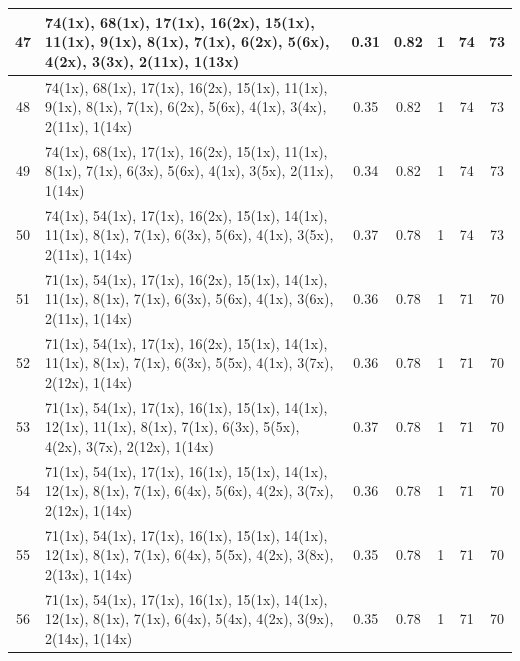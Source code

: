 \begin{small}
\begin{longtable}{|c|p{4cm}|c|c|c|c|c|}
  47 & 74(1x), 68(1x), 17(1x), 16(2x), 15(1x), 11(1x), 9(1x), 8(1x), 7(1x), 6(2x), 5(6x), 4(2x), 3(3x), 2(11x), 1(13x) & \cellcolor{colorGood}  0.31 & \cellcolor{colorGood} 0.82 & 1 & 74 & \cellcolor{colorBad} 73 \\   \hline
  48 & 74(1x), 68(1x), 17(1x), 16(2x), 15(1x), 11(1x), 9(1x), 8(1x), 7(1x), 6(2x), 5(6x), 4(1x), 3(4x), 2(11x), 1(14x) & \cellcolor{colorGood}  0.35 & \cellcolor{colorGood} 0.82 & 1 & 74 & \cellcolor{colorBad} 73 \\   \hline
  49 & 74(1x), 68(1x), 17(1x), 16(2x), 15(1x), 11(1x), 8(1x), 7(1x), 6(3x), 5(6x), 4(1x), 3(5x), 2(11x), 1(14x) & \cellcolor{colorGood}  0.34 & \cellcolor{colorGood} 0.82 & 1 & 74 & \cellcolor{colorBad} 73 \\   \hline
  50 & 74(1x), 54(1x), 17(1x), 16(2x), 15(1x), 14(1x), 11(1x), 8(1x), 7(1x), 6(3x), 5(6x), 4(1x), 3(5x), 2(11x), 1(14x) & \cellcolor{colorGood}  0.37 & \cellcolor{colorGood} 0.78 & 1 & 74 & \cellcolor{colorBad} 73 \\   \hline
  51 & 71(1x), 54(1x), 17(1x), 16(2x), 15(1x), 14(1x), 11(1x), 8(1x), 7(1x), 6(3x), 5(6x), 4(1x), 3(6x), 2(11x), 1(14x) & \cellcolor{colorGood}  0.36 & \cellcolor{colorGood} 0.78 & 1 & 71 & \cellcolor{colorBad} 70 \\   \hline
  52 & 71(1x), 54(1x), 17(1x), 16(2x), 15(1x), 14(1x), 11(1x), 8(1x), 7(1x), 6(3x), 5(5x), 4(1x), 3(7x), 2(12x), 1(14x) & \cellcolor{colorGood}  0.36 & \cellcolor{colorGood} 0.78 & 1 & 71 & \cellcolor{colorBad} 70 \\   \hline
  53 & 71(1x), 54(1x), 17(1x), 16(1x), 15(1x), 14(1x), 12(1x), 11(1x), 8(1x), 7(1x), 6(3x), 5(5x), 4(2x), 3(7x), 2(12x), 1(14x) & \cellcolor{colorGood}  0.37 & \cellcolor{colorGood} 0.78 & 1 & 71 & \cellcolor{colorBad} 70 \\   \hline
  54 & 71(1x), 54(1x), 17(1x), 16(1x), 15(1x), 14(1x), 12(1x), 8(1x), 7(1x), 6(4x), 5(6x), 4(2x), 3(7x), 2(12x), 1(14x) & \cellcolor{colorGood}  0.36 & \cellcolor{colorGood} 0.78 & 1 & 71 & \cellcolor{colorBad} 70 \\   \hline
  55 & 71(1x), 54(1x), 17(1x), 16(1x), 15(1x), 14(1x), 12(1x), 8(1x), 7(1x), 6(4x), 5(5x), 4(2x), 3(8x), 2(13x), 1(14x) & \cellcolor{colorGood}  0.35 & \cellcolor{colorGood} 0.78 & 1 & 71 & \cellcolor{colorBad} 70 \\   \hline
  56 & 71(1x), 54(1x), 17(1x), 16(1x), 15(1x), 14(1x), 12(1x), 8(1x), 7(1x), 6(4x), 5(4x), 4(2x), 3(9x), 2(14x), 1(14x) & \cellcolor{colorGood}  0.35 & \cellcolor{colorGood} 0.78 & 1 & 71 & \cellcolor{colorBad} 70 \\   \hline

\end{longtable}
\end{small}
